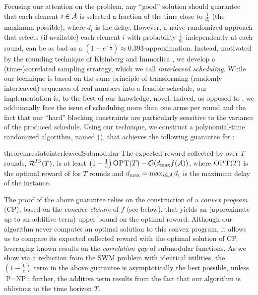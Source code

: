 Focusing our attention on the \rsm problem, any ``good'' solution should guarantee that each element $i \in \operatorname{\mathcal{A}}$ is selected a fraction of the time close to $\frac{1}{d_i}$ (the maximum possible), where $d_i$ is the delay. However, a naive randomized approach that selects (if available) each element $i$ with probability $\frac{1}{d_i}$ independently at each round, can be as bad as a $(1 - e^{-\frac{1}{2}}) \approx 0.393$-approximation. Instead, motivated by the rounding technique of Kleinberg and Immorlica \cite{KI18}, we develop a (time-)correlated sampling strategy, which we call {\em interleaved scheduling}. While our technique is based on the same principle of transforming (randomly interleaved) sequences of real numbers into a feasible schedule, our implementation is, to the best of our knowledge, novel. Indeed, as opposed to \cite{KI18}, we additionally face the issue of scheduling more than one arms per round and the fact that our ``hard'' blocking constraints are particularly sensitive to the variance of the produced schedule. Using our technique, we construct a polynomial-time randomized algorithm, named \is (\IS), that achieves the following guarantee for \rsm:

\begin{restatable}{theorem}{restateinterleavedSubmodular}\label{thm:interleavedSubmodular}
The expected reward collected by \is over $T$ rounds, $\operatorname{\mathcal{R}}^{IS}(T)$, is at least
$
\left(1 - \frac{1}{e} \right) \textsc{OPT}(T) - \mathcal{O}(d_{\max} f(\operatorname{\mathcal{A}}))
$, where $\textsc{OPT}(T)$ is the optimal reward of \rsm for $T$ rounds and $d_{\max} = \max_{i \in \operatorname{\mathcal{A}}} d_i$ is the maximum delay of the instance.
\end{restatable}

The proof of the above guarantee relies on the construction of a {\em convex program} (CP), based on the {\em concave closure} of $f$ (see below), that yields an (approximate up to an additive term) upper bound on the optimal reward. Although our algorithm never computes an optimal solution to this convex program, it allows us to compare its expected collected reward with the optimal solution of CP, leveraging known results on the {\em correlation gap} of submodular functions. As we show via a reduction from the SWM problem with identical utilities, the $\left(1 - \frac{1}{e}\right)$ term in the above guarantee is asymptotically the best possible, unless $\text{P} = \text{NP}$; further, the additive term results from the fact that our algorithm is oblivious to the time horizon $T$. 


